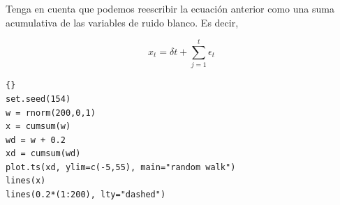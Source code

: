 
Tenga en cuenta que podemos reescribir la ecuaci\'on anterior como una suma acumulativa de las variables de ruido blanco. Es decir,

\begin{equation*}
x_t = \delta t + \sum_{j=1}^{t} \epsilon_t 
\end{equation*}


\begin{lstlisting}[title={‘Código R para generar Caminata Aleatoria’},basicstyle=\ttfamily]{}
set.seed(154)
w = rnorm(200,0,1)
x = cumsum(w)
wd = w + 0.2
xd = cumsum(wd)
plot.ts(xd, ylim=c(-5,55), main="random walk")
lines(x)
lines(0.2*(1:200), lty="dashed")
\end{lstlisting}\label{codigoCaminataAleatoria}


